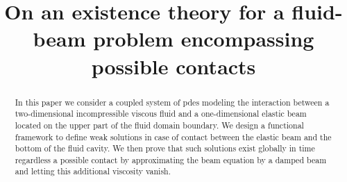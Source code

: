 \documentclass[JEP,XML,SOM,Unicode,NoFloatCountersInSection]{cedram}
\theoremstyle{remark}
\theoremstyle{definition}
\begin{document}
\frontmatter
\title{On an existence theory for a fluid-beam problem encompassing possible contacts}

\author[\initial{J.-J.} \lastname{Casanova}]{ }
\address{CEREMADE, UMR CNRS 7534, Université Paris-Dauphine, PSL Research University\\
Place du Maréchal de Lattre de Tassigny, 75775 Paris Cedex 16, France}

\author[\initial{C.} \lastname{Grandmont}]{ }
\address{Inria Paris\\
75012 Paris, France\\
\& Sorbonne Université, UMR 7598 LJLL\\
75005 Paris, France}

\author[\initial{M.} \lastname{Hillairet}]{\nobreakauthor {}}
\address{IMAG, Univ Montpellier, CNRS\\
Montpellier, France}





\begin{abstract}
In this paper we consider a coupled system of pdes modeling the interaction between a two-dimensional incompressible viscous fluid and a one-dimensional elastic beam located on the upper part of the fluid domain boundary. We design a functional framework to define weak solutions in case of contact between the elastic beam and the bottom of the fluid cavity. We then prove that such solutions exist globally in time regardless a possible contact by approximating the beam equation by a damped beam and letting this additional viscosity vanish.
\end{abstract}
\end{document}
